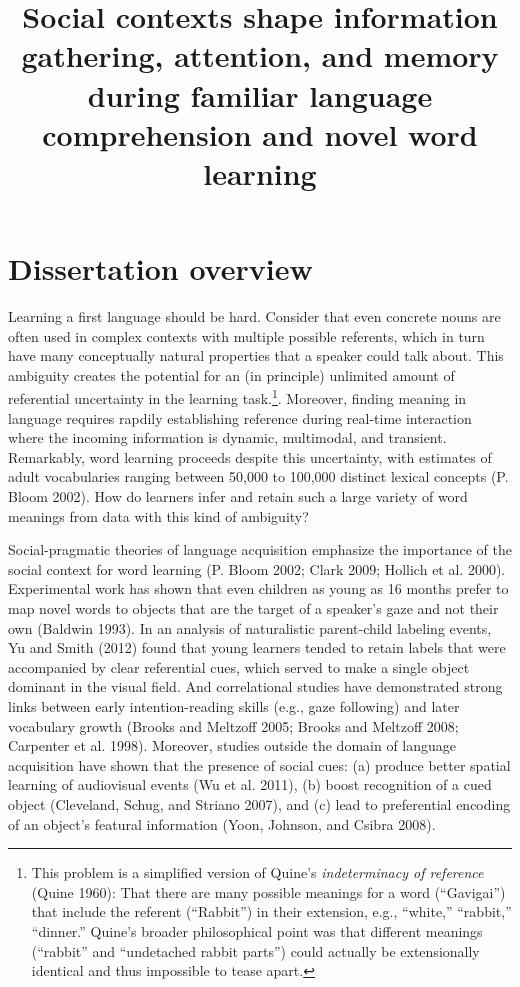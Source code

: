 \documentclass[]{elsarticle} %
\begin{document}
\begin{frontmatter}

  \title{Social contexts shape information gathering, attention, and memory
during familiar language comprehension and novel word learning}
    
  \begin{abstract}
  
  \end{abstract}
  
 \end{frontmatter}

\section{Dissertation overview}\label{background}

Learning a first language should be hard. Consider that even concrete
nouns are often used in complex contexts with multiple possible
referents, which in turn have many conceptually natural properties that
a speaker could talk about. This ambiguity creates the potential for an
(in principle) unlimited amount of referential uncertainty in the
learning task.\footnote{This problem is a simplified version of Quine's
  \textit{indeterminacy of reference} (Quine 1960): That there are many
  possible meanings for a word (``Gavigai'') that include the referent
  (``Rabbit'') in their extension, e.g., ``white,'' ``rabbit,''
  ``dinner.'' Quine's broader philosophical point was that different
  meanings (``rabbit'' and ``undetached rabbit parts'') could actually
  be extensionally identical and thus impossible to tease apart.}.
Moreover, finding meaning in language requires rapdily establishing
reference during real-time interaction where the incoming information is
dynamic, multimodal, and transient. Remarkably, word learning proceeds
despite this uncertainty, with estimates of adult vocabularies ranging
between 50,000 to 100,000 distinct lexical concepts (P. Bloom 2002). How
do learners infer and retain such a large variety of word meanings from
data with this kind of ambiguity?

Social-pragmatic theories of language acquisition emphasize the
importance of the social context for word learning (P. Bloom 2002; Clark
2009; Hollich et al. 2000). Experimental work has shown that even
children as young as 16 months prefer to map novel words to objects that
are the target of a speaker's gaze and not their own (Baldwin 1993). In
an analysis of naturalistic parent-child labeling events, Yu and Smith
(2012) found that young learners tended to retain labels that were
accompanied by clear referential cues, which served to make a single
object dominant in the visual field. And correlational studies have
demonstrated strong links between early intention-reading skills (e.g.,
gaze following) and later vocabulary growth (Brooks and Meltzoff 2005;
Brooks and Meltzoff 2008; Carpenter et al. 1998). Moreover, studies
outside the domain of language acquisition have shown that the presence
of social cues: (a) produce better spatial learning of audiovisual
events (Wu et al. 2011), (b) boost recognition of a cued object
(Cleveland, Schug, and Striano 2007), and (c) lead to preferential
encoding of an object's featural information (Yoon, Johnson, and Csibra
2008).
\end{document}

